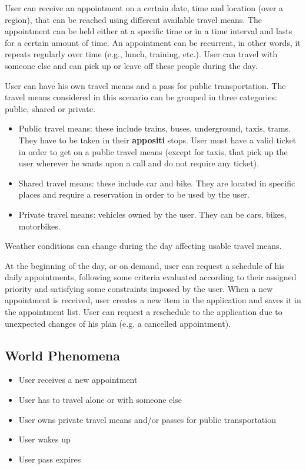 User can receive an appointment on a certain date, time and location (over a region), that can be reached using different available travel means. The appointment can be held either at a specific time or in a time interval and lasts for a certain amount of time. An appointment can be recurrent, in other words, it repeats regularly over time (e.g., lunch, training, etc.). User can travel with someone else and can pick up or leave off these people during the day.

User can have his own travel means and a pass for public transportation. 
The travel means considered in this scenario can be grouped in three categories: public, shared or private.
\begin{itemize}
\item Public travel means: these include trains, buses, underground, taxis, trams. They have to be taken in their \textbf{appositi} stops. User must have a valid ticket in order to get on a public travel means (except for taxis, that pick up the user wherever he wants upon a call and do not require any ticket). 
\item Shared travel means: these include car and bike. They are located in specific places and require a reservation in order to be used by the user.
\item Private travel means: vehicles owned by the user. They can be cars, bikes, motorbikes.
\end{itemize}

Weather conditions can change during the day affecting usable travel means.

At the beginning of the day, or on demand, user can request a schedule of his daily appointments, following some criteria evaluated according to their assigned priority and satisfying some constraints imposed by the user.
When a new appointment is received, user creates a new item in the application and saves it in the appointment list. User can request a reschedule to the application due to unexpected changes of his plan (e.g. a cancelled appointment).

\subsection{World Phenomena}
\begin{itemize}
\item User receives a new appointment
\item User has to travel alone or with someone else
\item User owns private travel means and/or passes for public transportation
\item User wakes up
\item User pass expires
\end{itemize}

